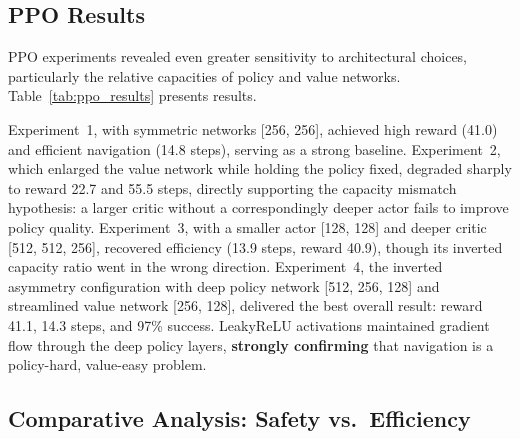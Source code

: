 \documentclass{article}
\begin{document}
\subsection{PPO Results}

PPO experiments revealed even greater sensitivity to architectural choices,
particularly the relative capacities of policy and value networks.
Table~\ref{tab:ppo_results} presents results.

\begin{table}[t]
\centering
{}
\caption{PPO Experimental Results}
\label{tab:ppo_results}
\end{table}

Experiment~1, with symmetric networks [256, 256], achieved high reward (41.0) and efficient navigation (14.8 steps), serving as a strong baseline. Experiment~2, which enlarged the value network while holding the policy fixed, degraded sharply to reward 22.7 and 55.5 steps, directly supporting the capacity mismatch hypothesis: a larger critic without a correspondingly deeper actor fails to improve policy quality. Experiment~3, with a smaller actor [128, 128] and deeper critic [512, 512, 256], recovered efficiency (13.9 steps, reward 40.9), though its inverted capacity ratio went in the wrong direction. Experiment~4, the inverted asymmetry configuration with deep policy network [512, 256, 128] and streamlined value network [256, 128], delivered the best overall result:
reward 41.1, 14.3 steps, and 97\% success. LeakyReLU activations maintained
gradient flow through the deep policy layers, \textbf{strongly confirming} that
navigation is a policy-hard, value-easy problem.

\subsection{Comparative Analysis: Safety vs.\ Efficiency}
\end{document}
